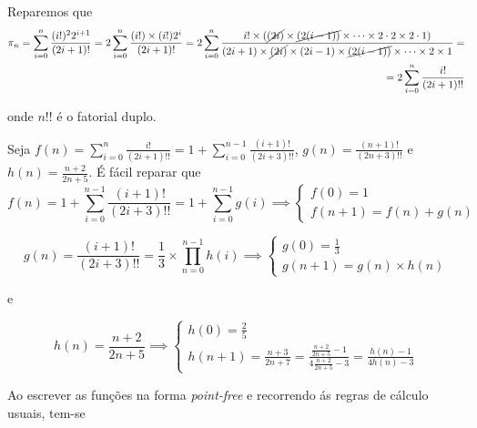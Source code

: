 \documentclass[11pt, a4paper, fleqn]{article}
\begin{document}
Reparemos que
\begin{eqnarray*}
	\ensuremath{\pi }_n = \sum_{i=0}^n \frac{(i!)^2 {2^{i+1}}}{(2i+1)!} = 2\sum_{i=0}^n \frac{(i!) \times (i!){2^{i}}}{(2i+1)!}  =  2\sum_{i=0}^n \frac{i! \times ( \cancel{(2i)} \times \cancel{(2(i-1))} \times \dots \times 2 \cdot 2 \times 2\cdot 1)}{(2i+1)\times \cancel{(2i)} \times (2i-1) \times \cancel{(2(i-1))} \times \dots \times 2 \times 1} = \\ =2\sum_{i=0}^n \frac{i!}{(2i+1)!!}  
\end{eqnarray*}

onde $n!!$ é o fatorial duplo.

Seja $f(n) = \sum_{i=0}^n \frac{i!}{(2i+1)!!} = 1 + \sum_{i=0}^{n-1} \frac{(i+1)!}{(2i+3)!!} $, $g(n) = \frac{(n+1)!}{(2n+3)!!}$ e $h(n) = \frac{n+2}{2n+5}$.
É fácil reparar que 
\[
f(n) = 1+\sum_{i=0}^{n-1} \frac{(i+1)!}{(2i+3)!!} = 1+ \sum_{i=0}^{n-1} g(i) \implies \begin{cases}
f(0) = 1 \\
f(n+1) = f(n)+ g(n)
\end{cases}
\]

\[
g(n) = \frac{(i+1)!}{(2i+3)!!} = \frac{1}{3} \times \prod_{n=0}^{n-1} h(i) \implies \begin{cases}
g(0) = \frac{1}{3} \\
g(n+1) = g(n)\times h(n)
\end{cases}
\]

e

\[
h(n) = \frac{n+2}{2n+5} \implies \begin{cases}
h(0) = \frac{2}{5} \\
h(n+1) = \frac{n+3}{2n+7} = \frac{\frac{n+2}{2n+5} - 1  }{ 4 \frac{n+2}{2n+5} -3} = \frac{h(n)-1}{4h(n)-3}
\end{cases}
\]

Ao escrever as funções na forma \textit{point-free} e recorrendo ás regras de cálculo usuais, tem-se
\end{document}
